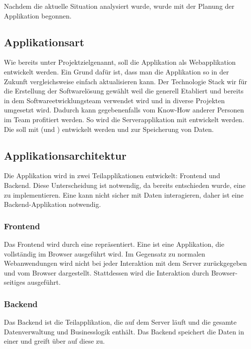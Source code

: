 Nachdem die aktuelle Situation analysiert wurde, wurde mit der Planung der Applikation begonnen.

\subsection{Applikationsart}

Wie bereits unter Projektziel\todo genannt, soll die Applikation als Webapplikation
entwickelt werden. Ein Grund dafür ist, dass man die Applikation so in der Zukunft
vergleichsweise einfach aktualisieren kann. Der Technologie Stack  wir für die Erstellung der Softwarelösung gewählt weil die generell Etabliert und bereits in dem Softwareetwicklungsteam verwendet wird und in diverse Projekten umgesetzt wird. Dadurch kann gegebenenfalls vom Know-How anderer Personen im Team profitiert werden. So wird die Serverapplikation mit    entwickelt werden. Die  soll mit  (und ) entwickelt werden und  zur Speicherung von Daten.

\subsection{Applikationsarchitektur}
\label{sec:Planungsphase:Applikationsarchitektur}

Die Applikation wird in zwei Teilapplikationen entwickelt: Frontend und Backend. Diese Unterscheidung ist notwendig, da bereits entschieden wurde, eine  zu implementieren. Eine  kann nicht sicher mit Daten interagieren, daher ist eine Backend-Applikation notwendig.

\subsubsection{Frontend}

Das Frontend wird durch eine  repräsentiert. Eine  ist eine Applikation, die vollständig im Browser ausgeführt wird. Im Gegensatz zu normalen Webanwendungen wird nicht bei jeder Interaktion mit dem Server  zurückgegeben und vom Browser dargestellt. Stattdessen wird die Interaktion durch Browser-seitiges   ausgeführt.

\subsubsection{Backend}

Das Backend ist die Teilapplikation, die auf dem Server läuft und die gesamte Datenverwaltung und Businesslogik enthält. Das Backend speichert die Daten in einer  und greift über  auf diese zu.

